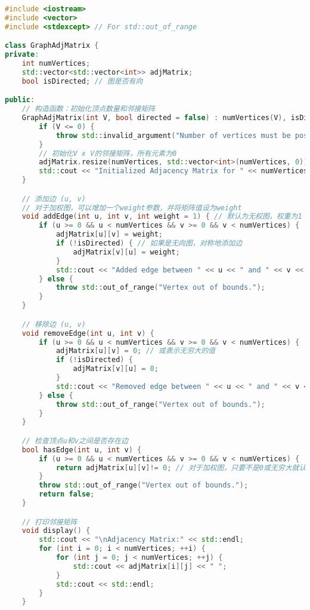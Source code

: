 \begin{lstlisting}[language=cpp]
#include <iostream>
#include <vector>
#include <stdexcept> // For std::out_of_range

class GraphAdjMatrix {
private:
    int numVertices;
    std::vector<std::vector<int>> adjMatrix;
    bool isDirected; // 图是否有向

public:
    // 构造函数：初始化顶点数量和邻接矩阵
    GraphAdjMatrix(int V, bool directed = false) : numVertices(V), isDirected(directed) {
        if (V <= 0) {
            throw std::invalid_argument("Number of vertices must be positive.");
        }
        // 初始化V x V的邻接矩阵，所有元素为0
        adjMatrix.resize(numVertices, std::vector<int>(numVertices, 0));
        std::cout << "Initialized Adjacency Matrix for " << numVertices << " vertices." << std::endl;
    }

    // 添加边 (u, v)
    // 对于加权图，可以增加一个weight参数，并将矩阵值设为weight
    void addEdge(int u, int v, int weight = 1) { // 默认为无权图，权重为1
        if (u >= 0 && u < numVertices && v >= 0 && v < numVertices) {
            adjMatrix[u][v] = weight;
            if (!isDirected) { // 如果是无向图，对称地添加边
                adjMatrix[v][u] = weight;
            }
            std::cout << "Added edge between " << u << " and " << v << " with weight " << weight << "." << std::endl;
        } else {
            throw std::out_of_range("Vertex out of bounds.");
        }
    }

    // 移除边 (u, v)
    void removeEdge(int u, int v) {
        if (u >= 0 && u < numVertices && v >= 0 && v < numVertices) {
            adjMatrix[u][v] = 0; // 或表示无穷大的值
            if (!isDirected) {
                adjMatrix[v][u] = 0;
            }
            std::cout << "Removed edge between " << u << " and " << v << "." << std::endl;
        } else {
            throw std::out_of_range("Vertex out of bounds.");
        }
    }

    // 检查顶点u和v之间是否存在边
    bool hasEdge(int u, int v) {
        if (u >= 0 && u < numVertices && v >= 0 && v < numVertices) {
            return adjMatrix[u][v]!= 0; // 对于加权图，只要不是0或无穷大就认为有边
        }
        throw std::out_of_range("Vertex out of bounds.");
        return false;
    }

    // 打印邻接矩阵
    void display() {
        std::cout << "\nAdjacency Matrix:" << std::endl;
        for (int i = 0; i < numVertices; ++i) {
            for (int j = 0; j < numVertices; ++j) {
                std::cout << adjMatrix[i][j] << " ";
            }
            std::cout << std::endl;
        }
    }


\end{lstlisting}
